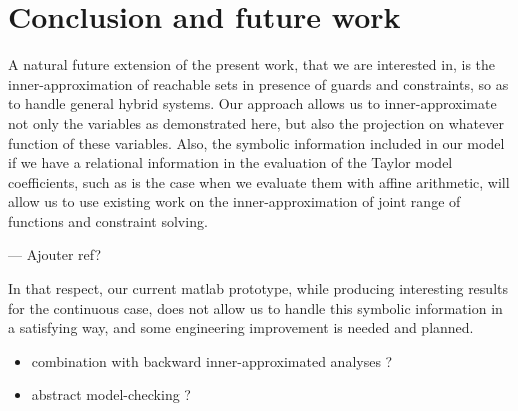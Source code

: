 \documentclass{sig-alternate-05-2015} %
\newcommand\ForAuthors[1]%
 {\par\smallskip                     %
  \begin{center}%
   \fbox%
   {\parbox{0.9\linewidth}%
    {\raggedright\sc--- #1}%
   }%
  \end{center}%
  \par\smallskip                     %
 }
\begin{document}
\section{Conclusion and future work}
%
A natural future extension of the present work, that we are interested in, is the inner-approximation of reachable sets 
in presence of guards and constraints, so as to handle general hybrid systems. Our approach allows us to inner-approximate 
not only the variables as demonstrated here, but also the projection on whatever function of these variables. Also, the 
symbolic information included in our model if we have a relational information in the evaluation of the Taylor model coefficients, 
such as is the case when we evaluate them with affine arithmetic, will allow us to use existing work on the inner-approximation 
of joint range of functions and constraint solving. 
\ForAuthors{Ajouter ref?} 
In that respect, our current matlab prototype, while producing interesting results for the continuous case, does not allow us to 
handle this symbolic information in a satisfying way, and some engineering improvement is needed and planned.


\begin{itemize}
\item combination with backward inner-approximated analyses ? 
\item abstract model-checking ? 
\end{itemize}



\end{document}
